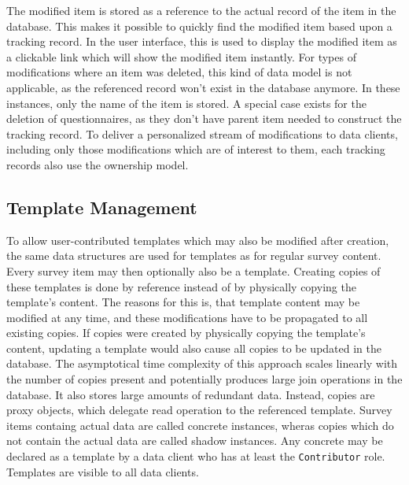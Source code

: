\documentclass[a4paper,11pt]{article}
\def\inline{\lstinline[basicstyle=\ttfamily,keywordstyle={}]}
\begin{document}
                The modified item is stored as a reference to the actual record of the item in the database.
                This makes it possible to quickly find the modified item based upon
                a tracking record. In the user interface, this is used to display the
                modified item as a clickable link which will show the modified item
                instantly. For types of modifications where an item was deleted, this 
                kind of data model is not applicable, as the referenced record won't 
                exist in the database anymore. In these instances, only the name of
                the item is stored. A special case exists for the deletion of questionnaires,
                as they don't have parent item needed to construct the tracking record.
                To deliver a personalized stream of modifications to data clients,
                including only those modifications which are of interest to them,
                each tracking records also use the ownership model.

            \subsection{Template Management}
                To allow user-contributed templates which may also be modified after
                creation, the same data structures are used for templates as for
                regular survey content. Every survey item may then optionally also
                be a template. Creating copies of these templates is done by
                reference instead of by physically copying the template's content.
                The reasons for this is, that template content may be modified
                at any time, and these modifications have to be propagated to
                all existing copies. If copies were created by physically
                copying the template's content, updating a template would
                also cause all copies to be updated in the database. The
                asymptotical time complexity of this approach scales linearly
                with the number of copies present and potentially produces
                large join operations in the database. It also stores
                large amounts of redundant data. Instead, copies are
                proxy objects, which delegate read operation to the referenced
                template. Survey items containg actual data are called
                concrete instances, wheras copies which do not contain
                the actual data are called shadow instances.
                Any concrete may be declared as a template by a data client
                who has at least the \inline{Contributor} role.
                Templates are visible to all data clients.
\end{document}
